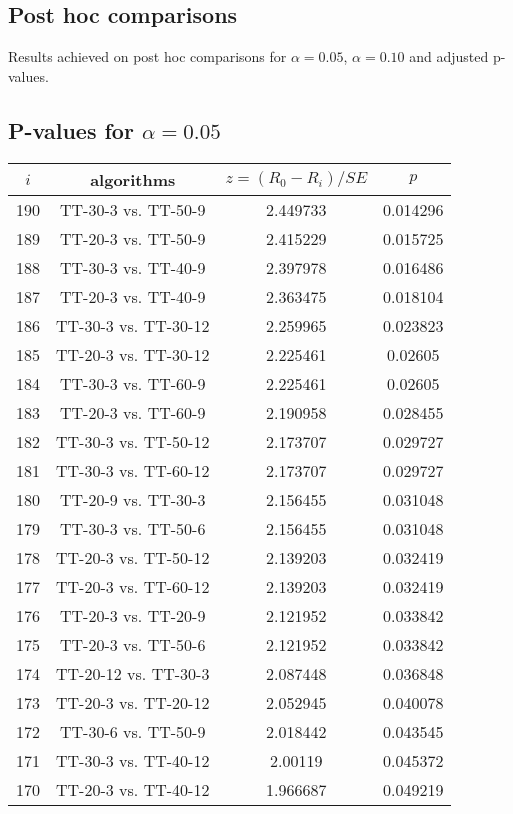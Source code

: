 \documentclass[a4paper,10pt]{article}
\begin{document}
\begin{landscape}
\section{Post hoc comparisons}

Results achieved on post hoc comparisons for $\alpha = 0.05$, $\alpha = 0.10$ and adjusted p-values.

\subsection{P-values for $\alpha=0.05$}

\begin{table}[!htp]
\centering\scriptsize
\begin{tabular}{cccc}
$i$&algorithms&$z=(R_0 - R_i)/SE$&$p$\\
\hline190&TT-30-3 vs. TT-50-9&2.449733&0.014296\\
189&TT-20-3 vs. TT-50-9&2.415229&0.015725\\
188&TT-30-3 vs. TT-40-9&2.397978&0.016486\\
187&TT-20-3 vs. TT-40-9&2.363475&0.018104\\
186&TT-30-3 vs. TT-30-12&2.259965&0.023823\\
185&TT-20-3 vs. TT-30-12&2.225461&0.02605\\
184&TT-30-3 vs. TT-60-9&2.225461&0.02605\\
183&TT-20-3 vs. TT-60-9&2.190958&0.028455\\
182&TT-30-3 vs. TT-50-12&2.173707&0.029727\\
181&TT-30-3 vs. TT-60-12&2.173707&0.029727\\
180&TT-20-9 vs. TT-30-3&2.156455&0.031048\\
179&TT-30-3 vs. TT-50-6&2.156455&0.031048\\
178&TT-20-3 vs. TT-50-12&2.139203&0.032419\\
177&TT-20-3 vs. TT-60-12&2.139203&0.032419\\
176&TT-20-3 vs. TT-20-9&2.121952&0.033842\\
175&TT-20-3 vs. TT-50-6&2.121952&0.033842\\
174&TT-20-12 vs. TT-30-3&2.087448&0.036848\\
173&TT-20-3 vs. TT-20-12&2.052945&0.040078\\
172&TT-30-6 vs. TT-50-9&2.018442&0.043545\\
171&TT-30-3 vs. TT-40-12&2.00119&0.045372\\
170&TT-20-3 vs. TT-40-12&1.966687&0.049219\\

\end{tabular}
\end{table}
\end{landscape}
\end{document}
